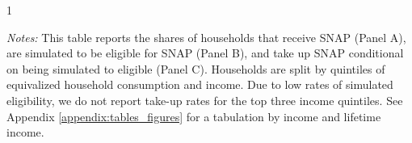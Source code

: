 \begin{table}[t]
\begin{tabular*}{\textwidth}{@{\extracolsep{\fill}}llcccccc@{}}
\end{tabular*}
            \begin{spacing}{1}
\begin{tablenotes}
       \item \footnotesize \textit{Notes:} This table reports the shares of households that receive SNAP (Panel A), are simulated to be eligible for SNAP (Panel B), and take up SNAP conditional on being simulated to eligible (Panel C). Households are split by quintiles of equivalized household consumption and income.  Due to low rates of simulated eligibility, we do not report take-up rates for the top three income quintiles. See Appendix \ref{appendix:tables_figures} for a tabulation by income and lifetime income.
      \end{tablenotes}
       \end{spacing}
\end{table}
    

